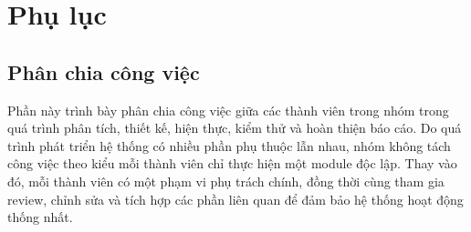 \chapter{Phụ lục}

\section{Phân chia công việc}

Phần này trình bày phân chia công việc giữa các thành viên trong nhóm trong quá trình phân tích, thiết kế, hiện thực, kiểm thử và hoàn thiện báo cáo. Do quá trình phát triển hệ thống có nhiều phần phụ thuộc lẫn nhau, nhóm không tách công việc theo kiểu mỗi thành viên chỉ thực hiện một module độc lập. Thay vào đó, mỗi thành viên có một phạm vi phụ trách chính, đồng thời cùng tham gia review, chỉnh sửa và tích hợp các phần liên quan để đảm bảo hệ thống hoạt động thống nhất.

